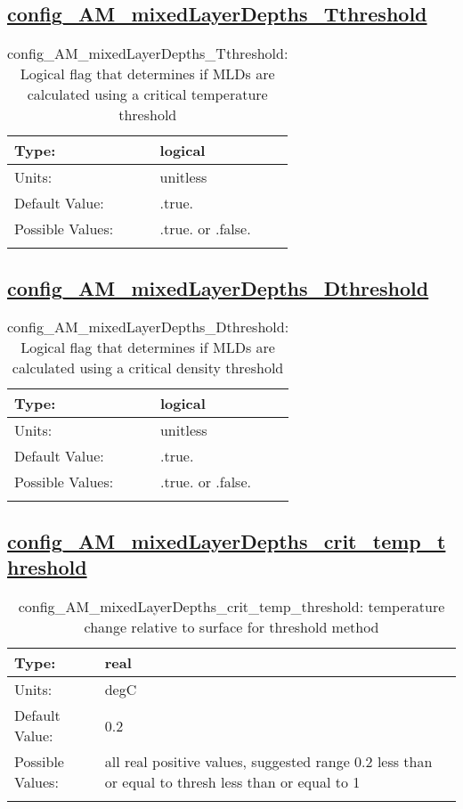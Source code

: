 \subsection[config\_AM\_mixedLayerDepths\_Tthreshold]{\hyperref[sec:nm_tab_AM_mixedLayerDepths]{config\_AM\_mixedLayerDepths\_Tthreshold}}
\label{subsec:nm_sec_config_AM_mixedLayerDepths_Tthreshold}
\begin{center}
\begin{longtable}{| p{2.0in} || p{4.0in} |}
    \hline
    Type: & logical \\
    \hline
    Units: & \si{unitless} \\
    \hline
    Default Value: & .true. \\
    \hline
    Possible Values: & .true. or .false. \\
    \hline
    \caption{config\_AM\_mixedLayerDepths\_Tthreshold: Logical flag that determines if MLDs are calculated using a critical temperature threshold}
\end{longtable}
\end{center}
\subsection[config\_AM\_mixedLayerDepths\_Dthreshold]{\hyperref[sec:nm_tab_AM_mixedLayerDepths]{config\_AM\_mixedLayerDepths\_Dthreshold}}
\label{subsec:nm_sec_config_AM_mixedLayerDepths_Dthreshold}
\begin{center}
\begin{longtable}{| p{2.0in} || p{4.0in} |}
    \hline
    Type: & logical \\
    \hline
    Units: & \si{unitless} \\
    \hline
    Default Value: & .true. \\
    \hline
    Possible Values: & .true. or .false. \\
    \hline
    \caption{config\_AM\_mixedLayerDepths\_Dthreshold: Logical flag that determines if MLDs are calculated using a critical density threshold}
\end{longtable}
\end{center}
\subsection[config\_AM\_mixedLayerDepths\_crit\_temp\_threshold]{\hyperref[sec:nm_tab_AM_mixedLayerDepths]{config\_AM\_mixedLayerDepths\_crit\_temp\_threshold}}
\label{subsec:nm_sec_config_AM_mixedLayerDepths_crit_temp_threshold}
\begin{center}
\begin{longtable}{| p{2.0in} || p{4.0in} |}
    \hline
    Type: & real \\
    \hline
    Units: & \si{degC} \\
    \hline
    Default Value: & 0.2 \\
    \hline
    Possible Values: & all real positive values, suggested range 0.2 less than or equal to thresh less than or equal to 1 \\
    \hline
    \caption{config\_AM\_mixedLayerDepths\_crit\_temp\_threshold: temperature change relative to surface for threshold method}
\end{longtable}
\end{center}

